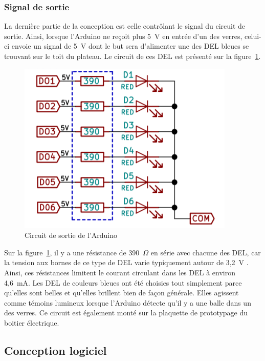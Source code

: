 \subsubsection{Signal de sortie}

La dernière partie de la conception est celle contrôlant le signal du circuit de sortie.
Ainsi, lorsque l’Arduino ne reçoit plus 5~V en entrée d’un des verres, celui-ci envoie un signal de 5~V dont le but sera d’alimenter une des DEL bleues se trouvant sur le toit du plateau.
Le circuit de ces DEL est présenté sur la figure~\ref{fig:s2-verre-Figure6}.

\begin{figure}[h!]
    \centering
    \includegraphics[width=0.4\linewidth]{img/s2/verre/Figure6}
    \caption{Circuit de sortie de l'Arduino}
    \label{fig:s2-verre-Figure6}
\end{figure}

Sur la figure~\ref{fig:s2-verre-Figure6}, il y a une résistance de 390~$\Omega$ en série avec chacune des DEL, car la tension aux bornes de ce type de DEL varie typiquement autour de 3,2~V \cite{noauthor_data_2007}.
Ainsi, ces résistances limitent le courant circulant dans les DEL à environ 4,6~mA.
Les DEL de couleurs bleues ont été choisies tout simplement parce qu’elles sont belles et qu’elles brillent bien de façon générale.
Elles agissent comme témoins lumineux lorsque l’Arduino détecte qu’il y a une balle dans un des verres.
Ce circuit est également monté sur la plaquette de prototypage du boitier électrique.

\subsection{Conception logiciel}



